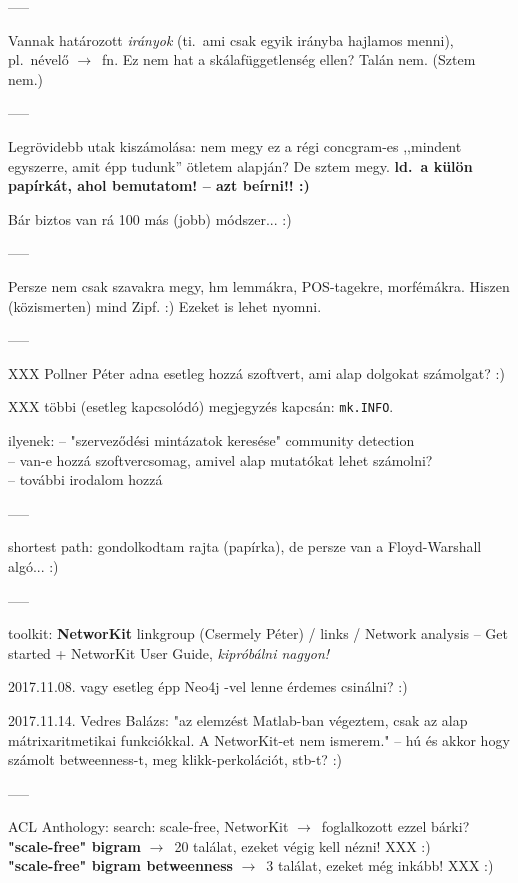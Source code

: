 \documentclass{llncs}
\newcommand{\nyil}{$\rightarrow$\ }
\newcommand{\embf}[1]{\textbf{#1}}
\begin{document}
-----

Vannak határozott \emph{irányok}
(ti.\ ami csak egyik irányba hajlamos menni), pl.\ névelő \nyil fn.  
Ez nem hat a skálafüggetlenség ellen? Talán nem. (Sztem nem.)

-----

Legrövidebb utak kiszámolása:
nem megy ez a régi concgram-es ,,mindent egyszerre, amit épp tudunk''
ötletem alapján? De sztem megy.
\embf{ld.\ a külön papírkát, ahol bemutatom! -- azt beírni!! :)}

Bár biztos van rá 100 más (jobb) módszer... :)

-----

Persze nem csak szavakra megy, hm lemmákra, POS-tagekre, morfémákra.
Hiszen (közismerten) mind Zipf. :) Ezeket is lehet nyomni.

-----

XXX Pollner Péter adna esetleg hozzá szoftvert,
ami alap dolgokat számolgat? :)

XXX többi (esetleg kapcsolódó) megjegyzés 
\cite{kovacs2012magyar} kapcsán: {\tt mk.INFO}.

ilyenek:
-- "szerveződési mintázatok keresése" community detection\\
-- van-e hozzá szoftvercsomag, amivel alap mutatókat lehet számolni?\\
-- további irodalom hozzá

-----

shortest path: gondolkodtam rajta (papírka),
de persze van a Floyd-Warshall algó... :)

-----

toolkit: \embf{NetworKit}
linkgroup (Csermely Péter) / links / Network analysis
-- Get started + NetworKit User Guide, \emph{kipróbálni nagyon!}

2017.11.08. vagy esetleg épp Neo4j -vel lenne érdemes csinálni? :)

2017.11.14. Vedres Balázs: "az elemzést Matlab-ban végeztem,
csak az alap mátrixaritmetikai funkciókkal. A NetworKit-et nem ismerem."
-- hú és akkor hogy számolt betweenness-t, meg klikk-perkolációt, stb-t? :)


-----

ACL Anthology: search: scale-free, NetworKit
\nyil foglalkozott ezzel bárki?\\
\embf{"scale-free" bigram} \nyil 20 találat, ezeket végig kell nézni! XXX :)\\
\embf{"scale-free" bigram betweenness} \nyil 3 találat, ezeket még inkább! XXX :)
\end{document}
